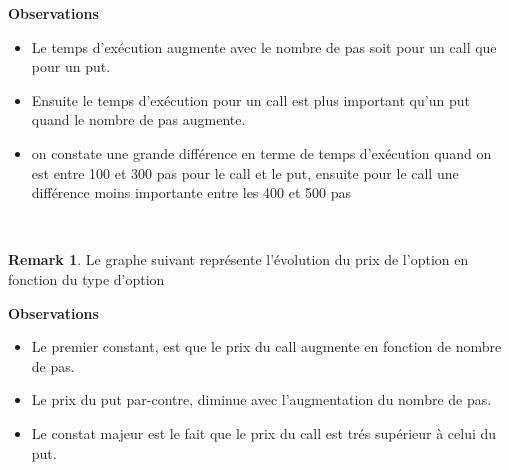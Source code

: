 \documentclass[12pt]{article}
\theoremstyle{definition}
\theoremstyle{definition}
\newtheorem*{remark}{Remark}
\begin{document}
\begin{center}
        \textbf{Observations}
\end{center}
\begin{itemize}
\item Le temps d'exécution augmente avec le nombre de pas soit pour un call que pour un put.
\item Ensuite le temps d'exécution pour un call est plus important qu'un put quand le nombre de pas augmente. 
\item on constate une grande différence en terme de temps d'exécution quand on est entre 100 et 300 pas pour le call et le put, ensuite pour le call une différence moins importante entre les 400 et 500
 pas
 \end{itemize} 

 \\
\begin{remark}
Le graphe suivant représente l'évolution du prix de l'option en fonction du type d'option

\end{remark}
\begin{center}
        \textbf{Observations}
\end{center}
\begin{itemize}
\item Le premier constant, est que le prix du call augmente en fonction de nombre de pas.
\item Le prix du put par-contre, diminue avec l'augmentation du nombre de pas.
\item Le constat majeur est le fait que le prix du call est trés supérieur à celui du put.
\end{itemize}
\end{document}
